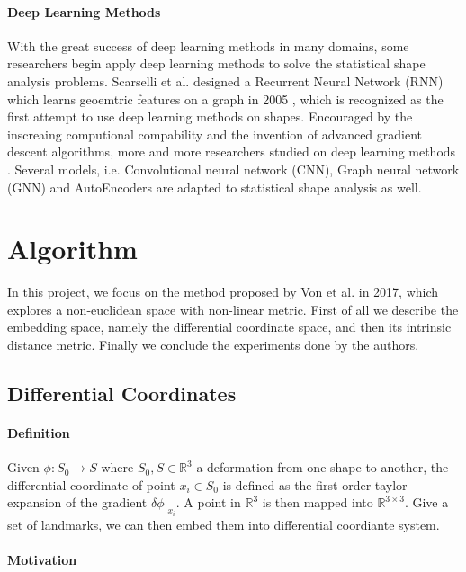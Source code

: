 \documentclass[11pt]{article}
\begin{document}
\paragraph{Deep Learning Methods} With the great success of deep learning methods in many domains, some researchers begin apply deep learning methods to solve the statistical shape analysis problems.
Scarselli et al. designed a Recurrent Neural Network (RNN) which learns geoemtric features on a graph in 2005 \cite{gori2005new}, which is recognized as the first attempt to use deep learning methods on shapes.
Encouraged by the inscreaing computional compability and the invention of advanced gradient descent algorithms, more and more researchers studied on deep learning methods \cite{bronstein2017geometric} \cite{monti2017geometric}.
Several models, i.e. Convolutional neural network (CNN), Graph neural network (GNN) and AutoEncoders are adapted to statistical shape analysis as well.

\section{Algorithm}

In this project, we focus on the method proposed by Von et al. in 2017, which explores a non-euclidean space with non-linear metric.
First of all we describe the embedding space, namely the differential coordinate space, and then its intrinsic distance metric. 
Finally we conclude the experiments done by the authors.

\subsection{Differential Coordinates}

\paragraph{Definition}

Given $\phi: S_0 \to S$ where $S_0, S \in \mathbb{R}^3$ a deformation from one shape to another, the differential coordinate of point $x_i \in S_0$ is defined as the first order taylor expansion of the gradient $\delta \phi |_{x_i}$.
A point in $\mathbb{R}^3$ is then mapped into $\mathbb{R}^{3 \times 3}$. Give a set of landmarks, we can then embed them into differential coordiante system.

\paragraph{Motivation} 
\end{document}
